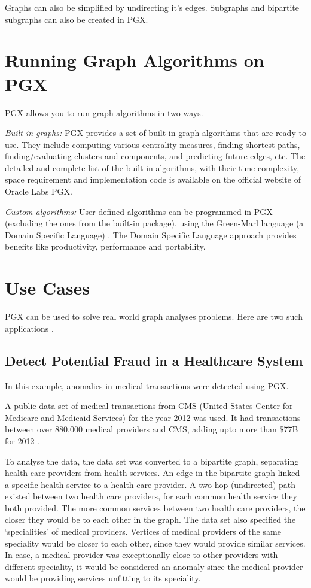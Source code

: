 \documentclass[9pt,twocolumn,twoside]{../../styles/osajnl}
\begin{document}
Graphs can also be simplified by undirecting it's edges. Subgraphs and
bipartite subgraphs can also be created in PGX.

\section{Running Graph Algorithms on PGX}
PGX allows you to run graph algorithms in two ways.

\textit{Built-in graphs:} PGX provides a set of built-in graph
algorithms that are ready to use. They include computing various
centrality measures, finding shortest paths, finding/evaluating
clusters and components, and predicting future edges, etc. The
detailed and complete list of the built-in algorithms, with their time
complexity, space requirement and implementation code is available on
the official website of Oracle Labs PGX.

\textit{Custom algorithms:} User-defined algorithms can be programmed
in PGX (excluding the ones from the built-in package), using the
Green-Marl language (a Domain Specific Language) \cite{www-graph}. The
Domain Specific Language approach provides benefits like productivity,
performance and portability.

\section{Use Cases}
PGX can be used to solve real world graph analyses problems. Here are
two such applications \cite{www-use}.

\subsection{Detect Potential Fraud in a Healthcare System}
In this example, anomalies in medical transactions were detected using
PGX.

A public data set of medical transactions from CMS (United States
Center for Medicare and Medicaid Services) for the year 2012 was
used. It had transactions between over 880,000 medical providers and
CMS, adding upto more than $\$$77B for 2012 \cite{www-hcs}.

To analyse the data, the data set was converted to a bipartite graph,
separating health care providers from health services. An edge in the
bipartite graph linked a specific health service to a health care
provider. A two-hop (undirected) path existed between two health care
providers, for each common health service they both provided. The more
common services between two health care providers, the closer they
would be to each other in the graph. The data set also specified the
‘specialities’ of medical providers. Vertices of medical providers of
the same speciality would be closer to each other, since they would
provide similar services. In case, a medical provider was
exceptionally close to other providers with different speciality, it
would be considered an anomaly since the medical provider would be
providing services unfitting to its speciality.
\end{document}
